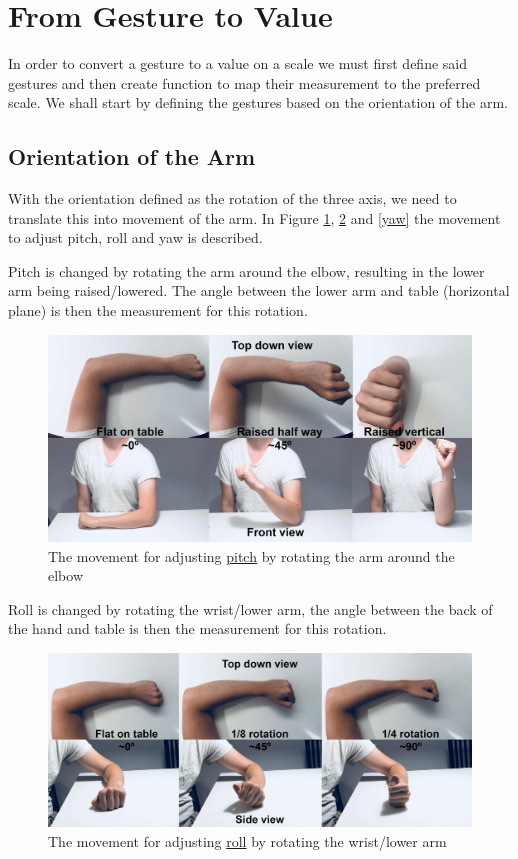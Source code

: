 \section{From Gesture to Value}
In order to convert a gesture to a value on a scale we must first define said gestures and then create function to map their measurement to the preferred scale. We shall start by defining the gestures based on the orientation of the arm.

\subsection{Orientation of the Arm}
With the orientation defined as the rotation of the three axis, we need to translate this into movement of the arm. In Figure \ref{pitch}, \ref{roll} and \ref{yaw} the movement to adjust pitch, roll and yaw is described.

Pitch is changed by rotating the arm around the elbow, resulting in the lower arm being raised/lowered. The angle between the lower arm and table (horizontal plane) is then the measurement for this rotation.

\begin{figure}[h!]
    \centering
    \includegraphics[width=1\textwidth]{figures/pitch.png}
    \caption{The movement for adjusting \underline{pitch} by rotating the arm around the elbow}
    \label{pitch}
\end{figure}

Roll is changed by rotating the wrist/lower arm, the angle between the back of the hand and table is then the measurement for this rotation.

\begin{figure}[h!]
    \centering
    \includegraphics[width=1\textwidth]{figures/roll.png}
    \caption{The movement for adjusting \underline{roll} by rotating the wrist/lower arm}
    \label{roll}
\end{figure}

